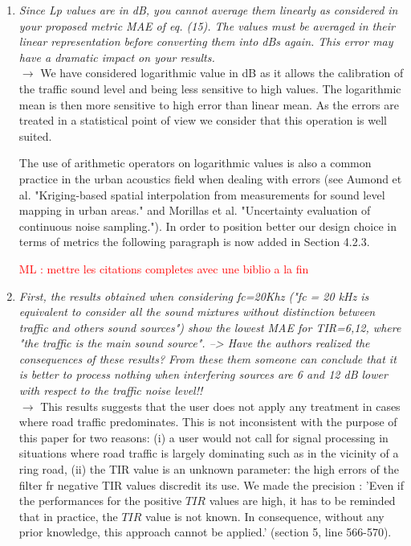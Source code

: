 \documentclass[10pt]{article}
\newcommand{\ml}[1]{\textcolor{red}{ML : #1}}
\begin{document}
\begin{enumerate}
\item \emph{Since Lp values are in dB, you cannot average them linearly as considered in your proposed metric MAE of eq. (15). The values must be averaged in their linear representation before converting them into dBs again. This error may have a dramatic impact on your results.}\\
$\rightarrow$ We have considered logarithmic value in dB as it allows the calibration of the traffic sound level and being less sensitive to high values.
The logarithmic mean is then more sensitive to high error than linear mean. As the errors are treated in a statistical point of view we consider that this operation is well suited.

The use of arithmetic operators on logarithmic values is also a common practice in the urban acoustics field when dealing with errors (see Aumond et al. "Kriging-based spatial interpolation from measurements for sound level mapping in urban areas." and Morillas et al. "Uncertainty evaluation of continuous noise sampling."). In order to position better our design choice in terms of metrics the following paragraph is now added in Section 4.2.3. %

\ml{mettre les citations completes avec une biblio a la fin}

\item \emph{First, the results obtained when considering fc=20Khz ("fc = 20 kHz is equivalent to consider all the sound mixtures without distinction between traffic and others sound sources") show the lowest MAE for TIR={6,12}, where "the traffic is the main sound source".
--> Have the authors realized the consequences of these results? From these them someone can conclude that it is better to process nothing when interfering sources are 6 and 12 dB lower with respect to the traffic noise level!!}\\
$\rightarrow$ This results suggests that the user does not apply any treatment in cases where road traffic predominates. This is not inconsistent with the purpose of this paper for two reasons: (i) a user would not call for signal processing in situations where road traffic is largely dominating such as in the vicinity of a ring road, (ii) the TIR value is an unknown parameter: the high errors of the filter fr negative TIR values discredit its use. We made the precision :
'Even if the performances for the positive $TIR$ values are high, it has to be reminded that in practice, the $TIR$ value is not known. In consequence, without any prior knowledge, this approach cannot be applied.' (section 5, line 566-570).




\end{enumerate}
\end{document}
